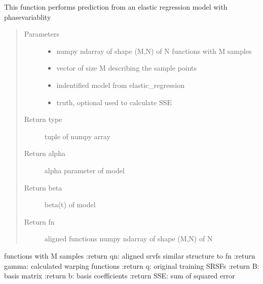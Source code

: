 \documentclass[letterpaper,10pt,english]{sphinxmanual}
\begin{document}
\begin{fulllineitems}
\label{\detokenize{regression:regression.elastic_prediction}}
This function performs prediction from an elastic regression model
with phase\sphinxhyphen{}variablity
\begin{quote}\begin{description}
\item[{Parameters}] \leavevmode\begin{itemize}
\item {} 
 \textendash{} numpy ndarray of shape (M,N) of N functions with M samples

\item {} 
 \textendash{} vector of size M describing the sample points

\item {} 
 \textendash{} indentified model from elastic\_regression

\item {} 
 \textendash{} truth, optional used to calculate SSE

\end{itemize}

\item[{Return type}] \leavevmode
tuple of numpy array

\item[{Return alpha}] \leavevmode
alpha parameter of model

\item[{Return beta}] \leavevmode
beta(t) of model

\item[{Return fn}] \leavevmode
aligned functions \sphinxhyphen{} numpy ndarray of shape (M,N) of N

\end{description}\end{quote}

functions with M samples
:return qn: aligned srvfs \sphinxhyphen{} similar structure to fn
:return gamma: calculated warping functions
:return q: original training SRSFs
:return B: basis matrix
:return b: basis coefficients
:return SSE: sum of squared error

\end{fulllineitems}
\end{document}
